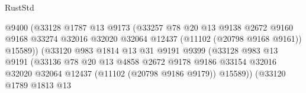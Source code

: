 \begin{lexlean}{RustStd}
\begin{coremodule}
                                          @9400
                                          (@33128
                                            @1787
                                            @13
                                            @9173
                                            (@33257
                                              @78
                                              @20
                                              @13
                                              @9138
                                              @2672
                                              @9160
                                              @9168
                                              @33274
                                              @32016
                                              @32020
                                              @32064
                                              @12437
                                              (@11102 (@20798 @9168 @9161))
                                              @15589))
                                          (@33120
                                            @983
                                            @1814
                                            @13
                                            @31
                                            @9191
                                            @9399
                                            (@33128
                                              @983
                                              @13
                                              @9191
                                              (@33136
                                                @78
                                                @20
                                                @13
                                                @4858
                                                @2672
                                                @9178
                                                @9186
                                                @33154
                                                @32016
                                                @32020
                                                @32064
                                                @12437
                                                (@11102 (@20798 @9186 @9179))
                                                @15589))
                                            (@33120
                                              @1789
                                              @1813
                                              @13

\end{coremodule}
\end{lexlean}
